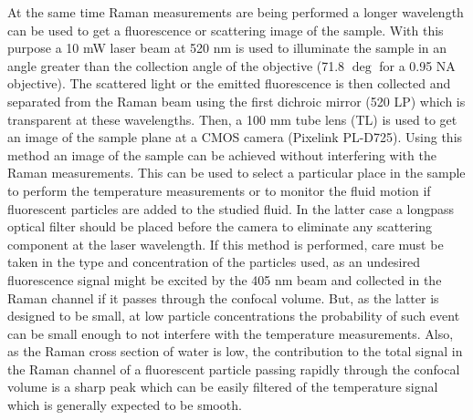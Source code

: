 \documentclass[twocolumn]{svjour3}       %
\begin{document}
\begin{figure}[h!]
\end{figure}

 At the same time Raman measurements are being performed a longer wavelength can be used to get a fluorescence or scattering image of the sample. With this purpose a 10 mW laser beam at 520 nm is used to illuminate the sample in an angle greater than the collection angle of the objective (71.8 $\deg$ for a 0.95 NA objective). The scattered light or the emitted fluorescence is then collected and separated from the Raman beam using the first dichroic mirror (520 LP) which is transparent at these wavelengths. Then, a 100 mm tube lens (TL) is used to get an image of the sample plane at a CMOS camera (Pixelink PL-D725). Using this method an image of the sample can be achieved without interfering with the Raman measurements. This can be used to select a particular place in the sample to perform the temperature measurements or to monitor the fluid motion if fluorescent particles are added to the studied fluid. In the latter case a longpass optical filter should be placed before the camera to eliminate any scattering component at the laser wavelength. If this method is performed, care must be taken in the type and concentration of the particles used, as an undesired fluorescence signal might be excited by the 405 nm beam and collected in the Raman channel if it passes through the confocal volume. But, as the latter is designed to be small, at low particle concentrations the probability of such event can be small enough to not interfere with the temperature measurements. Also, as the Raman cross section of water is low, the contribution to the total signal in the Raman channel of a fluorescent particle passing rapidly through the confocal volume is a sharp peak which can be easily filtered of the temperature signal which is generally expected to be smooth. 
 
\end{document}
